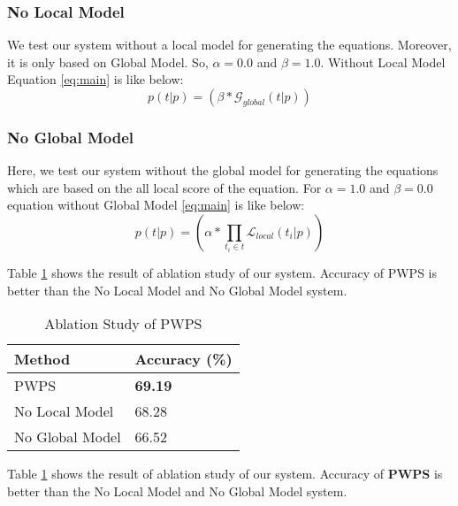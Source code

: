 \documentclass[document.tex]{subfiles}
\begin{document}
\subsubsection{No Local Model}
We test our system without a local model for generating the equations. Moreover, it is only based on Global Model. So, $\alpha = 0.0$ and $\beta = 1.0$. Without Local Model Equation \ref{eq:main} is like below:
\begin{equation}
	p(t|p) = (\beta * \mathcal{G}_{global}(t|p))
	\label{eq:Noloc}
\end{equation}
\subsubsection{No Global Model}
Here, we test our system without the global model for generating the equations which are based on the all local score of the equation. For $\alpha = 1.0$ and $\beta = 0.0$ equation without Global Model \ref{eq:main} is like below:
\begin{equation}
	p(t|p) = (\alpha * \prod_{t_i \in t} \mathcal{L}_{local}(t_i | p) ) 
	\label{eq:noGlob}
\end{equation}

Table \ref{tab:ablation} shows the result of ablation study of our system. Accuracy of PWPS is better than the No Local Model and No Global Model system.
\begin{table}[H]
	\caption{Ablation Study of PWPS}
	\begin{center}
		\begin{tabular}{|l|l|}
			\hline
			Method & Accuracy (\%)\\
			\hline
			PWPS & \textbf{69.19}\\
			No Local Model & 68.28\\
			No Global Model & 66.52\\
			\hline
		\end{tabular}
	\end{center}
	\label{tab:ablation}
\end{table}
Table \ref{tab:ablation} shows the result of ablation study of our system. Accuracy of \textbf{PWPS} is better than the No Local Model and No Global Model system.
\end{document}
